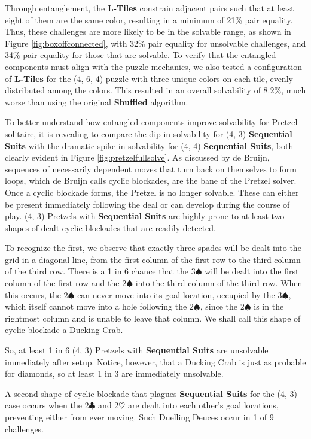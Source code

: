 \documentclass[journal]{IEEEtran}
\begin{document}
Through entanglement, the \textbf{L-Tiles} constrain adjacent pairs such that at least eight of them are the same color, resulting in a minimum of 21\% pair equality. Thus, these challenges are more likely to be in the solvable range, as shown in Figure \ref{fig:boxoffconnected}, with 32\% pair equality for unsolvable challenges, and 34\% pair equality for those that are solvable. To verify that the entangled components must align with the puzzle mechanics, we also tested a configuration of \textbf{L-Tiles} for the (4, 6, 4) puzzle with three unique colors on each tile, evenly distributed among the colors. This resulted in an overall solvability of 8.2\%, much worse than using the original \textbf{Shuffled} algorithm.

To better understand how entangled components improve solvability for Pretzel solitaire, it is revealing to compare the dip in solvability for (4, 3) \textbf{Sequential Suits} with the dramatic spike in solvability for (4, 4) \textbf{Sequential Suits}, both clearly evident in Figure \ref{fig:pretzelfullsolve}. As discussed by de Bruijn, sequences of necessarily dependent moves that turn back on themselves to form loops, which de Bruijn calls cyclic blockades, are the bane of the Pretzel solver. Once a cyclic blockade forms, the Pretzel is no longer solvable. These can either be present immediately following the deal or can develop during the course of play. (4, 3) Pretzels with \textbf{Sequential Suits} are highly prone to at least two shapes of dealt cyclic blockades that are readily detected.

To recognize the first, we observe that exactly three spades will be dealt into the grid in a diagonal line, from the first column of the first row to the third column of the third row. There is a 1 in 6 chance that the $3\spadesuit$ will be dealt into the first column of the first row and the $2\spadesuit$ into the third column of the third row. When this occurs, the $2\spadesuit$ can never move into its goal location, occupied by the $3\spadesuit$, which itself cannot move into a hole following the $2\spadesuit$, since the $2\spadesuit$ is in the rightmost column and is unable to leave that column. We shall call this shape of cyclic blockade a Ducking Crab.

So, at least 1 in 6 (4, 3) Pretzels with \textbf{Sequential Suits} are unsolvable immediately after setup. Notice, however, that a Ducking Crab is just as probable for diamonds, so at least 1 in 3 are immediately unsolvable.

A second shape of cyclic blockade that plagues \textbf{Sequential Suits} for the (4, 3) case occurs when the $2\clubsuit$ and $2\heartsuit$ are dealt into each other's goal locations, preventing either from ever moving. Such Duelling Deuces occur in 1 of 9 challenges.
\end{document}
